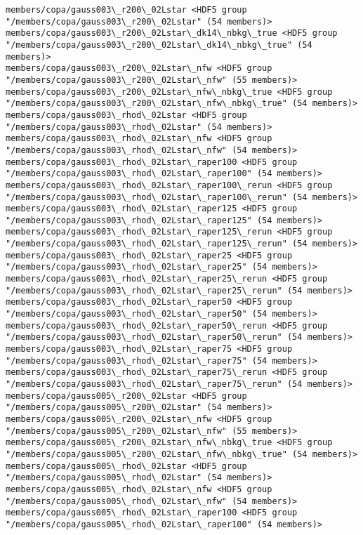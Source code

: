 \documentclass[11pt]{article}
\begin{document}
\begin{Verbatim}[commandchars=\\\{\}]
members/copa/gauss003\_r200\_02Lstar <HDF5 group "/members/copa/gauss003\_r200\_02Lstar" (54 members)>
members/copa/gauss003\_r200\_02Lstar\_dk14\_nbkg\_true <HDF5 group "/members/copa/gauss003\_r200\_02Lstar\_dk14\_nbkg\_true" (54 members)>
members/copa/gauss003\_r200\_02Lstar\_nfw <HDF5 group "/members/copa/gauss003\_r200\_02Lstar\_nfw" (55 members)>
members/copa/gauss003\_r200\_02Lstar\_nfw\_nbkg\_true <HDF5 group "/members/copa/gauss003\_r200\_02Lstar\_nfw\_nbkg\_true" (54 members)>
members/copa/gauss003\_rhod\_02Lstar <HDF5 group "/members/copa/gauss003\_rhod\_02Lstar" (54 members)>
members/copa/gauss003\_rhod\_02Lstar\_nfw <HDF5 group "/members/copa/gauss003\_rhod\_02Lstar\_nfw" (54 members)>
members/copa/gauss003\_rhod\_02Lstar\_raper100 <HDF5 group "/members/copa/gauss003\_rhod\_02Lstar\_raper100" (54 members)>
members/copa/gauss003\_rhod\_02Lstar\_raper100\_rerun <HDF5 group "/members/copa/gauss003\_rhod\_02Lstar\_raper100\_rerun" (54 members)>
members/copa/gauss003\_rhod\_02Lstar\_raper125 <HDF5 group "/members/copa/gauss003\_rhod\_02Lstar\_raper125" (54 members)>
members/copa/gauss003\_rhod\_02Lstar\_raper125\_rerun <HDF5 group "/members/copa/gauss003\_rhod\_02Lstar\_raper125\_rerun" (54 members)>
members/copa/gauss003\_rhod\_02Lstar\_raper25 <HDF5 group "/members/copa/gauss003\_rhod\_02Lstar\_raper25" (54 members)>
members/copa/gauss003\_rhod\_02Lstar\_raper25\_rerun <HDF5 group "/members/copa/gauss003\_rhod\_02Lstar\_raper25\_rerun" (54 members)>
members/copa/gauss003\_rhod\_02Lstar\_raper50 <HDF5 group "/members/copa/gauss003\_rhod\_02Lstar\_raper50" (54 members)>
members/copa/gauss003\_rhod\_02Lstar\_raper50\_rerun <HDF5 group "/members/copa/gauss003\_rhod\_02Lstar\_raper50\_rerun" (54 members)>
members/copa/gauss003\_rhod\_02Lstar\_raper75 <HDF5 group "/members/copa/gauss003\_rhod\_02Lstar\_raper75" (54 members)>
members/copa/gauss003\_rhod\_02Lstar\_raper75\_rerun <HDF5 group "/members/copa/gauss003\_rhod\_02Lstar\_raper75\_rerun" (54 members)>
members/copa/gauss005\_r200\_02Lstar <HDF5 group "/members/copa/gauss005\_r200\_02Lstar" (54 members)>
members/copa/gauss005\_r200\_02Lstar\_nfw <HDF5 group "/members/copa/gauss005\_r200\_02Lstar\_nfw" (55 members)>
members/copa/gauss005\_r200\_02Lstar\_nfw\_nbkg\_true <HDF5 group "/members/copa/gauss005\_r200\_02Lstar\_nfw\_nbkg\_true" (54 members)>
members/copa/gauss005\_rhod\_02Lstar <HDF5 group "/members/copa/gauss005\_rhod\_02Lstar" (54 members)>
members/copa/gauss005\_rhod\_02Lstar\_nfw <HDF5 group "/members/copa/gauss005\_rhod\_02Lstar\_nfw" (54 members)>
members/copa/gauss005\_rhod\_02Lstar\_raper100 <HDF5 group "/members/copa/gauss005\_rhod\_02Lstar\_raper100" (54 members)>

\end{Verbatim}
\end{document}
